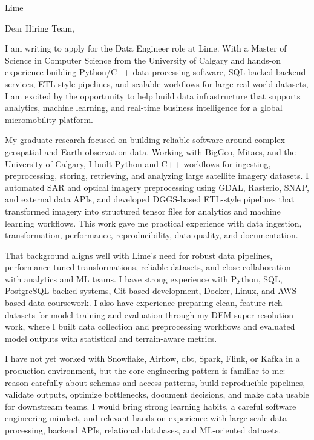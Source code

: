 \documentclass[11pt]{letter}
\begin{document}
\begin{letter}{Lime}

\opening{Dear Hiring Team,}

I am writing to apply for the Data Engineer role at Lime. With a Master of Science in Computer Science from the University of Calgary and hands-on experience building Python/C++ data-processing software, SQL-backed backend services, ETL-style pipelines, and scalable workflows for large real-world datasets, I am excited by the opportunity to help build data infrastructure that supports analytics, machine learning, and real-time business intelligence for a global micromobility platform.

My graduate research focused on building reliable software around complex geospatial and Earth observation data. Working with BigGeo, Mitacs, and the University of Calgary, I built Python and C++ workflows for ingesting, preprocessing, storing, retrieving, and analyzing large satellite imagery datasets. I automated SAR and optical imagery preprocessing using GDAL, Rasterio, SNAP, and external data APIs, and developed DGGS-based ETL-style pipelines that transformed imagery into structured tensor files for analytics and machine learning workflows. This work gave me practical experience with data ingestion, transformation, performance, reproducibility, data quality, and documentation.

That background aligns well with Lime's need for robust data pipelines, performance-tuned transformations, reliable datasets, and close collaboration with analytics and ML teams. I have strong experience with Python, SQL, PostgreSQL-backed systems, Git-based development, Docker, Linux, and AWS-based data coursework. I also have experience preparing clean, feature-rich datasets for model training and evaluation through my DEM super-resolution work, where I built data collection and preprocessing workflows and evaluated model outputs with statistical and terrain-aware metrics.

I have not yet worked with Snowflake, Airflow, dbt, Spark, Flink, or Kafka in a production environment, but the core engineering pattern is familiar to me: reason carefully about schemas and access patterns, build reproducible pipelines, validate outputs, optimize bottlenecks, document decisions, and make data usable for downstream teams. I would bring strong learning habits, a careful software engineering mindset, and relevant hands-on experience with large-scale data processing, backend APIs, relational databases, and ML-oriented datasets.


\end{letter}
\end{document}
